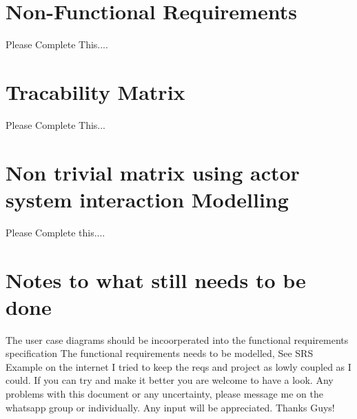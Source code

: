 \documentclass{article}
\begin{document}
\section{Non-Functional Requirements}
 
Please Complete This....

\newpage
\centering
\section{Tracability Matrix}
 
Please Complete This...

\newpage
\centering
\section{Non trivial matrix using actor system interaction Modelling}
 
Please Complete this....

\section{Notes to what still needs to be done}
The user case diagrams should be incoorperated into the functional requirements specification
The functional requirements needs to be modelled, See SRS Example on the internet 
I tried to keep the reqs and project as lowly coupled as I could. If you can try and make it better you are welcome to have a look.
Any problems with this document or any uncertainty, please message me on the whatsapp group or individually.
Any input will be appreciated.
Thanks Guys!
\end{document}
